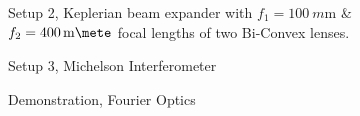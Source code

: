 \documentclass[main.tex]{subfiles}
\begin{document}
\begin{figure}\label{fig:4}
\centering{}
\caption{Setup 2, Keplerian beam expander with $f_1 = \SI{100}{m\metre}$ \& $f_2=\SI{400}{m\mete}$ focal lengths of two Bi-Convex lenses.}
\end{figure}

\begin{figure}\label{fig:5}
\centering{}
\caption{Setup 3, Michelson Interferometer}
\end{figure}

\begin{figure}\label{fig:5}
\centering{}
\caption{Demonstration, Fourier Optics}
\end{figure}
\end{document}
